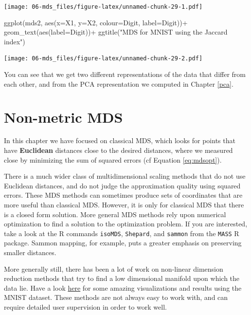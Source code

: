 \documentclass[
]{book}
\newenvironment{Shaded}{\begin{snugshade}}{\end{snugshade}}
\newcommand{\AttributeTok}[1]{\textcolor[rgb]{0.77,0.63,0.00}{#1}}
\newcommand{\FunctionTok}[1]{\textcolor[rgb]{0.00,0.00,0.00}{#1}}
\newcommand{\NormalTok}[1]{#1}
\newcommand{\SpecialCharTok}[1]{\textcolor[rgb]{0.00,0.00,0.00}{#1}}
\newcommand{\StringTok}[1]{\textcolor[rgb]{0.31,0.60,0.02}{#1}}
\theoremstyle{definition}
\theoremstyle{definition}
\theoremstyle{definition}
\theoremstyle{definition}
\theoremstyle{remark}
\begin{document}
\texttt{[image: 06-mds\_files/figure-latex/unnamed-chunk-29-1.pdf]}

\begin{Shaded}
\begin{Highlighting}[]
\FunctionTok{ggplot}\NormalTok{(mds2, }\FunctionTok{aes}\NormalTok{(}\AttributeTok{x=}\NormalTok{X1, }\AttributeTok{y=}\NormalTok{X2, }\AttributeTok{colour=}\NormalTok{Digit, }\AttributeTok{label=}\NormalTok{Digit))}\SpecialCharTok{+}
  \FunctionTok{geom\_text}\NormalTok{(}\FunctionTok{aes}\NormalTok{(}\AttributeTok{label=}\NormalTok{Digit))}\SpecialCharTok{+} 
  \FunctionTok{ggtitle}\NormalTok{(}\StringTok{"MDS for MNIST using the Jaccard index"}\NormalTok{) }
\end{Highlighting}
\end{Shaded}

\texttt{[image: 06-mds\_files/figure-latex/unnamed-chunk-29-2.pdf]}

You can see that we get two different representations of the data that differ from each other, and from the PCA representation we computed in Chapter \ref{pca}.

\hypertarget{non-metric-mds}{%
\section{Non-metric MDS}\label{non-metric-mds}}

In this chapter we have focused on classical MDS, which looks for points that have \textbf{Euclidean} distances close to the desired distances, where we measured close by minimizing the sum of squared errors (cf Equation \eqref{eq:mdsopt}).

There is a much wider class of multidimensional scaling methods that do not use Euclidean distances, and do not judge the approximation quality using squared errors. These MDS methods can sometimes produce sets of coordinates that are more useful than classical MDS. However, it is only for classical MDS that there is a closed form solution. More general MDS methods rely upon numerical optimization to find a solution to the optimization problem. If you are interested, take a look at the R commands \texttt{isoMDS}, \texttt{Shepard}, and \texttt{sammon} from the \texttt{MASS} R package. Sammon mapping, for example, puts a greater emphasis on preserving smaller distances.

More generally still, there has been a lot of work on non-linear dimension reduction methods that try to find a low dimensional manifold upon which the data lie. Have a look \href{https://colah.github.io/posts/2014-10-Visualizing-MNIST/}{here} for some amazing visualizations and results using the MNIST dataset. These methods are not always easy to work with, and can require detailed user supervision in order to work well.
\end{document}
